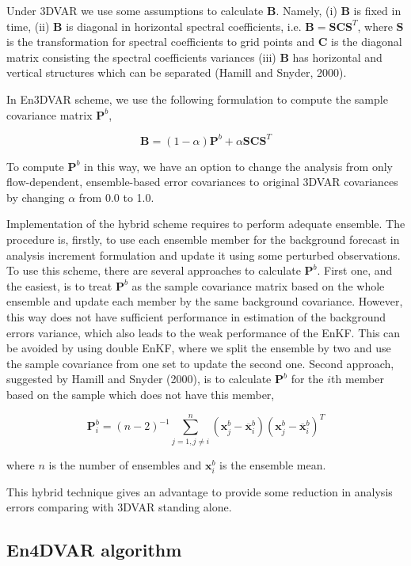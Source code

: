 \documentclass[a4,12pt]{article}
\numberwithin{equation}{section}
\begin{document}
Under 3DVAR we use some assumptions to calculate $\textbf{B}$. Namely, (i) $\textbf{B}$ is fixed in time, (ii) $\textbf{B}$ is diagonal in horizontal spectral coefficients, i.e. $\textbf{B} = \textbf{S}\textbf{C}\textbf{S}^{T}$, where $\textbf{S}$ is the transformation for spectral coefficients to grid points and $\textbf{C}$ is the diagonal matrix consisting the spectral coefficients variances (iii) $\textbf{B}$ has horizontal and vertical structures which can be separated (Hamill and Snyder, 2000).

In En3DVAR scheme, we use the following formulation to compute the sample covariance matrix $\textbf{P}^{b}$,

$$\textbf{B} = (1 - \alpha)\textbf{P}^{b} + \alpha \textbf{S}\textbf{C}\textbf{S}^{T}$$

To compute $\textbf{P}^{b}$ in this way, we have an option to change the analysis from only flow-dependent, ensemble-based error covariances to original 3DVAR covariances by changing $\alpha$ from 0.0 to 1.0.

Implementation of the hybrid scheme requires to perform adequate ensemble. The procedure is, firstly, to use each ensemble member for the background forecast in analysis increment formulation and update it using some perturbed observations. To use this scheme, there are several approaches to calculate $\textbf{P}^{b}$. First one, and the easiest, is to treat $\textbf{P}^{b}$ as the sample covariance matrix based on the whole ensemble and update each member by the same background covariance. However, this way does not have sufficient performance in estimation of the background errors variance, which also leads to the weak performance of the EnKF. This can be avoided by using double EnKF, where we split the ensemble by two and use the sample covariance from one set to update the second one. Second approach, suggested by Hamill and Snyder (2000), is to calculate $\textbf{P}^{b}$ for the $i$th member based on the sample which does not have this member, 

$$\textbf{P}^{b}_{i} = (n-2)^{-1} \sum_{j=1, j \ne i}^{n}(\textbf{x}_{j}^{b} - \overline{\textbf{x}}_{i}^{b})(\textbf{x}_{j}^{b} - \overline{\textbf{x}}_{i}^{b})^{T}$$

where $n$ is the number of ensembles and  $\textbf{x}_{i}^{b}$ is the ensemble mean.

This hybrid technique gives an advantage to provide some reduction in analysis errors comparing with 3DVAR standing alone.

\subsection{En4DVAR algorithm}
\end{document}
